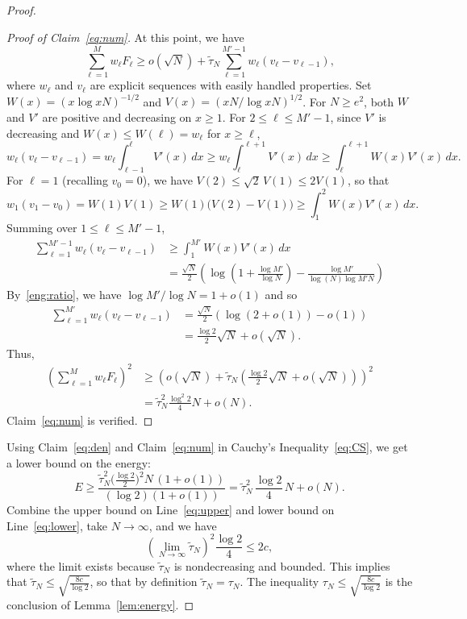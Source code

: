 \documentclass[10pt,a4paper]{amsart}
\begin{document}
\begin{proof}
\begin{proof}[Proof of Claim~\ref{eq:num}]
At this point, we have
    \[\sum_{\ell=1}^{M} w_\ell F_\ell \ge o(\sqrt N)+ \widetilde{\tau}_N \sum_{\ell=1}^{M'-1} w_\ell(v_\ell-v_{\ell-1}),\]
where $w_\ell$ and $v_\ell$ are explicit sequences with easily handled properties. Set $W(x)=(x \log xN)^{-1/2}$ and $V(x)=(xN/\log xN)^{1/2}$. For $N\ge e^2$, both $W$ and $V'$ are positive and decreasing on $x\ge 1$. 
For $2\le \ell\le M'-1$, since $V'$ is decreasing and $W(x)\le W(\ell)=w_\ell$ for $x\ge\ell$,
  \[w_\ell(v_\ell - v_{\ell-1}) = w_\ell\int_{\ell-1}^{\ell} V'(x)\,dx
    \ge w_\ell\int_{\ell}^{\ell+1} V'(x)\,dx
    \ge \int_{\ell}^{\ell+1} W(x)V'(x)\,dx.\]
For $\ell=1$ (recalling $v_0=0$), we have $V(2)\le\sqrt2\,V(1)\le 2V(1)$, so that
  \[w_1(v_1-v_0) = W(1)V(1) \ge W(1)\bigl(V(2)-V(1)\bigr) \ge \int_1^2 W(x)V'(x)\,dx.\]
Summing over $1\le\ell\le M'-1$,
\begin{align*}
    \sum_{\ell=1}^{M'-1} w_\ell(v_\ell-v_{\ell-1})
    &\ge \int_1^{M'} W(x) V'(x)\,dx \\
    &=\frac{\sqrt{N}}{2} \left(\log\left(1+\frac{\log M'}{\log N}\right)- \frac{\log M'}{\log(N) \log M'N}\right)
\end{align*}
By~\ref{eng:ratio}, we have $\log M' /\log N = 1+o(1)$ and so
\begin{align*}
  \sum_{\ell=1}^{M'} w_\ell(v_\ell-v_{\ell-1})
    &=\frac{\sqrt{N}}{2} \left(\log(2+o(1))-o(1)\right) \\
    &=\frac{\log 2}{2}\sqrt{N} + o(\sqrt N).
\end{align*}
Thus,
    \begin{align*}
    \left(\sum_{\ell=1}^{M} w_\ell F_\ell\right)^2
    &\ge \left( o(\sqrt{N})+ \widetilde{\tau}_N \left(\frac{\log 2}{2}\sqrt{N} + o(\sqrt N)\right)\right)^2 \\
    &= \widetilde{\tau}_N^2\frac{\log^2 2}{4} N + o(N).
    \end{align*}
Claim~\ref{eq:num} is verified.
\end{proof}

Using Claim~\ref{eq:den} and Claim~\ref{eq:num} in Cauchy's Inequality~\eqref{eq:CS}, we get a lower bound on the energy:
\begin{equation}\label{eq:lower}
   E\ge\frac{\widetilde{\tau}_N^{2}\bigl(\tfrac{\log2}{2}\bigr)^{2}N\,(1+o(1))}
            {(\log2)(1+o(1))}
   =\widetilde{\tau}_N^{2}\,\frac{\log2}{4}\,N+o(N).
\end{equation}
Combine the upper bound on Line~\eqref{eq:upper} and lower bound on Line~\eqref{eq:lower}, take $N\to\infty$, and we have
    \[ \left(\lim_{N\to\infty} \widetilde{\tau}_N\right)^2\frac{\log 2}{4} \le 2c,\]
where the limit exists because $\widetilde{\tau}_N$ is nondecreasing and bounded.
This implies that $\widetilde{\tau}_N\le \sqrt{\frac{8c}{\log 2}}$, so that by definition $\widetilde{\tau}_N=\tau_N$.
The inequality $\tau_N \le \sqrt{\frac{8c}{\log 2}}$ is the conclusion of Lemma~\ref{lem:energy}.
\end{proof}
\end{document}
